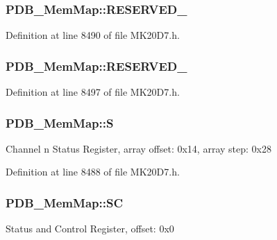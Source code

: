 \subsubsection[{\texorpdfstring{R\+E\+S\+E\+R\+V\+E\+D\+\_\+0}{RESERVED_0}}]{ P\+D\+B\+\_\+\+Mem\+Map\+::\+R\+E\+S\+E\+R\+V\+E\+D\+\_}\hypertarget{struct_p_d_b___mem_map_a26f57ce034a92374881fec262e7f9df6}{}\label{struct_p_d_b___mem_map_a26f57ce034a92374881fec262e7f9df6}


Definition at line 8490 of file M\+K20\+D7.\+h.

\subsubsection[{\texorpdfstring{R\+E\+S\+E\+R\+V\+E\+D\+\_\+1}{RESERVED_1}}]{ P\+D\+B\+\_\+\+Mem\+Map\+::\+R\+E\+S\+E\+R\+V\+E\+D\+\_}\hypertarget{struct_p_d_b___mem_map_ac0f307b988ef06e3d6ffa3502c92195f}{}\label{struct_p_d_b___mem_map_ac0f307b988ef06e3d6ffa3502c92195f}


Definition at line 8497 of file M\+K20\+D7.\+h.

\subsubsection[{\texorpdfstring{S}{S}}]{ P\+D\+B\+\_\+\+Mem\+Map\+::S}\hypertarget{struct_p_d_b___mem_map_afbd33089148cbb97dedff82c1c91c46d}{}\label{struct_p_d_b___mem_map_afbd33089148cbb97dedff82c1c91c46d}
Channel n Status Register, array offset\+: 0x14, array step\+: 0x28 

Definition at line 8488 of file M\+K20\+D7.\+h.

\subsubsection[{\texorpdfstring{SC}{SC}}]{ P\+D\+B\+\_\+\+Mem\+Map\+::\+SC}\hypertarget{struct_p_d_b___mem_map_a10fb0324a394cc747b6f7d8b4c811b57}{}\label{struct_p_d_b___mem_map_a10fb0324a394cc747b6f7d8b4c811b57}
Status and Control Register, offset\+: 0x0 

